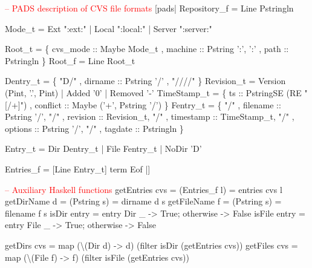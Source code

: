 \begin{code}
\textcolor{red}{-- PADS description of CVS file formats}
[pads|  Repository_f = Line Pstringln

        Mode_t = Ext ":ext:" | Local ":local:" | Server ":server:" 

        Root_t = \{ cvs_mode :: Maybe Mode_t
                     , machine  :: Pstring ':', ':'
                     , path     :: Pstringln            
                     \}                                  
        Root_f = Line Root_t

        Dentry_t = \{ "D/"
                       , dirname :: Pstring '/'
                       , "////"
                       \}
\mbox{}
        Revision_t  = Version (Pint, '.', Pint) | Added '0' | Removed '-'
        TimeStamp_t = \{ ts       :: PstringSE (RE "[/+]")
                          , conflict :: Maybe ('+', Pstring '/') \}
\mbox{}
        Fentry_t = \{                                  "/"  
                       , filename   :: Pstring '/',       "/"
                       , revision   :: Revision_t,        "/"
                       , timestamp  :: TimeStamp_t,       "/"   
                       , options    :: Pstring '/',       "/"  
                       , tagdate    :: Pstringln
                       \}

        Entry_t   = Dir Dentry_t | File Fentry_t | NoDir 'D'
     
        Entries_f = [Line Entry_t]  term Eof
|]
\end{code}
\begin{code}

\textcolor{red}{-- Auxiliary Haskell functions}
getEntries cvs =  (Entries_f l) = entries cvs  l
getDirName  d  =  (Pstring s)   = dirname   d  s
getFileName f  =  (Pstring s)   = filename  f  s
\mbox{}             
isDir entry  =  entry  {Dir _  -> True; otherwise -> False}
isFile entry =  entry  {File _ -> True; otherwise -> False}
\mbox{}                            

getDirs  cvs = map (\textbackslash(Dir d)  -> d) (filter isDir  (getEntries cvs))
getFiles cvs = map (\textbackslash(File f) -> f) (filter isFile (getEntries cvs))
\end{code}
